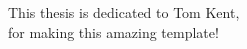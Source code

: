 \begin{dedication2}
\noindent This thesis is dedicated to Tom Kent,\\
for making this amazing template!
\end{dedication2}

